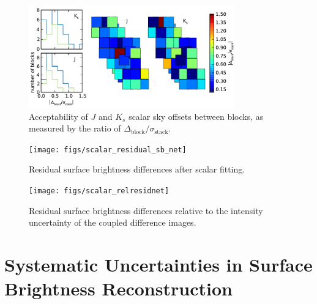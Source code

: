 \documentclass[iop]{emulateapj}
\begin{document}
% 
% 
% 
% 
% 
% 

\begin{figure}[t]
    \centering
        \includegraphics[width=3.5in]{figs/offset_ratio_map_enhanced}
    \caption{Acceptability of $J$ and $K_s$ scalar sky offsets between blocks, as measured by the ratio of $\Delta_\mathrm{block}/\sigma_\mathrm{stack}$.}
    \label{fig:offset_ratio_map}
\end{figure}

\begin{figure}[t]
    \centering
        \texttt{[image: figs/scalar\_residual\_sb\_net]}
    \caption{Residual surface brightness differences after scalar fitting.}
    \label{fig:scalar_residual_sb_net}
\end{figure}

\begin{figure}[t]
    \centering
        \texttt{[image: figs/scalar\_relresidnet]}
    \caption{Residual surface brightness differences relative to the intensity uncertainty of the coupled difference images.}
    \label{fig:scalar_relresidnet}
\end{figure}

\section{Systematic Uncertainties in Surface Brightness Reconstruction}
\label{sec:systematics}
\end{document}
